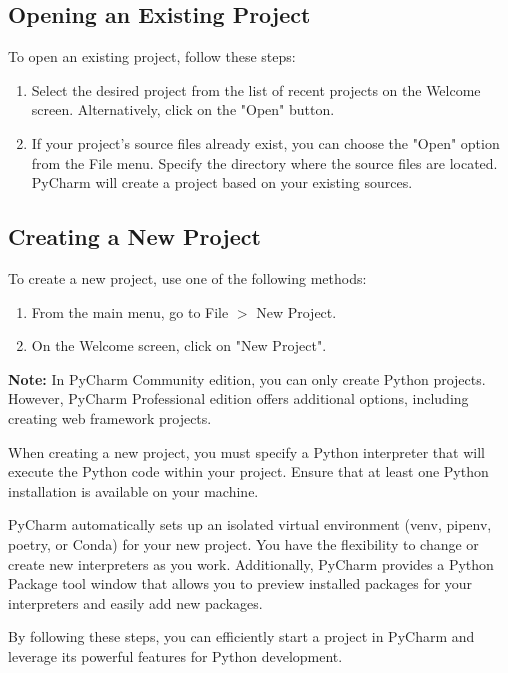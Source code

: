 \subsection{Opening an Existing Project}

To open an existing project, follow these steps:

\begin{enumerate}
	\item Select the desired project from the list of recent projects on the Welcome screen. Alternatively, click on the "Open" button.
	\item If your project's source files already exist, you can choose the "Open" option from the File menu. Specify the directory where the source files are located. PyCharm will create a project based on your existing sources.
\end{enumerate}

\subsection{Creating a New Project}

To create a new project, use one of the following methods:

\begin{enumerate}
	\item From the main menu, go to File $>$ New Project.
	\item On the Welcome screen, click on "New Project".
\end{enumerate}

\textbf{Note:} In PyCharm Community edition, you can only create Python projects. However, PyCharm Professional edition offers additional options, including creating web framework projects.

When creating a new project, you must specify a Python interpreter that will execute the Python code within your project. Ensure that at least one Python installation is available on your machine.

PyCharm automatically sets up an isolated virtual environment (venv, pipenv, poetry, or Conda) for your new project. You have the flexibility to change or create new interpreters as you work. Additionally, PyCharm provides a Python Package tool window that allows you to preview installed packages for your interpreters and easily add new packages.

By following these steps, you can efficiently start a project in PyCharm and leverage its powerful features for Python development.


